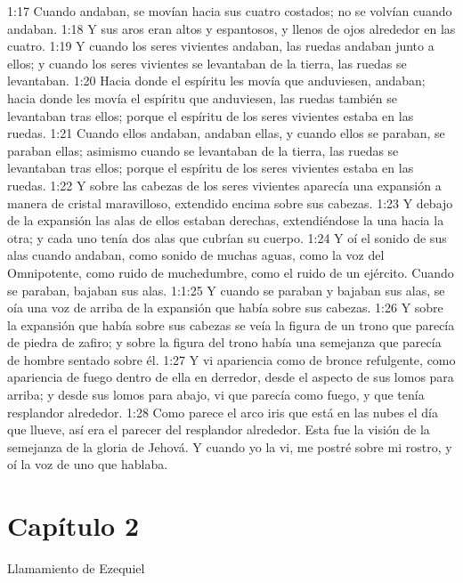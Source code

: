 1:17 Cuando andaban, se movían hacia sus cuatro costados; no se volvían cuando andaban.   
1:18 Y sus aros eran altos y espantosos, y llenos de ojos alrededor en las cuatro.   
1:19 Y cuando los seres vivientes andaban, las ruedas andaban junto a ellos; y cuando los seres vivientes se levantaban de la tierra, las ruedas se levantaban.   
1:20 Hacia donde el espíritu les movía que anduviesen, andaban; hacia donde les movía el espíritu que anduviesen, las ruedas también se levantaban tras ellos; porque el espíritu de los seres vivientes estaba en las ruedas.   
1:21 Cuando ellos andaban, andaban ellas, y cuando ellos se paraban, se paraban ellas; asimismo cuando se levantaban de la tierra, las ruedas se levantaban tras ellos; porque el espíritu de los seres vivientes estaba en las ruedas. 
1:22 Y sobre las cabezas de los seres vivientes aparecía una expansión a manera de cristal   maravilloso, extendido encima sobre sus cabezas.   
1:23 Y debajo de la expansión las alas de ellos estaban derechas, extendiéndose la una hacia la otra; y cada uno tenía dos alas que cubrían su cuerpo.   
1:24 Y oí el sonido de sus alas cuando andaban, como sonido de muchas aguas, como la voz del Omnipotente, como ruido de muchedumbre, como el ruido de un ejército. Cuando se paraban, bajaban sus alas.   
1:1:25 Y cuando se paraban y bajaban sus alas, se oía una voz de arriba de la expansión que había sobre sus cabezas.   
1:26 Y sobre la expansión que había sobre sus cabezas se veía la figura de un trono que parecía de piedra de zafiro; y sobre la figura del trono había una semejanza que parecía de hombre sentado sobre él. 
1:27 Y vi apariencia como de bronce refulgente, como apariencia de fuego dentro de ella en derredor, desde el aspecto de sus lomos para arriba; y desde sus lomos para abajo, vi que parecía como fuego, y que tenía resplandor alrededor.  
1:28 Como parece el arco iris que está en las nubes el día que llueve, así era el parecer del resplandor alrededor. Esta fue la visión de la semejanza de la gloria de Jehová. Y cuando yo la vi, me postré sobre mi rostro, y oí la voz de uno que hablaba.   
\section*{Capítulo 2  }
Llamamiento de Ezequiel   
  
